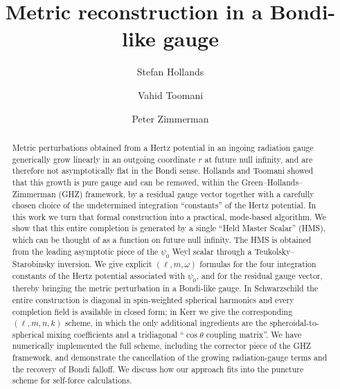 \documentclass[%
reprint,
 prd,
superscriptaddress,
nofootinbib,
aps,
dvipsnames
]{revtex4-2}
\newcommand{\emm}{m}
\def\l{\ensuremath{\ell}}                          %
\begin{document}
	
	\title{Metric reconstruction in a Bondi-like gauge}
	
	
		\author{Stefan Hollands }

\author{Vahid Toomani  \orcidlink{}}

\author{Peter Zimmerman}

	\begin{abstract}
    Metric perturbations obtained from a Hertz potential in an ingoing radiation
gauge generically grow linearly in an outgoing coordinate $r$ at future null infinity, and are
therefore not asymptotically flat in the Bondi sense.  Hollands and Toomani
showed that this growth is pure gauge and can be removed, within the
Green--Hollands--Zimmerman (GHZ) framework, by a residual gauge vector
together with a carefully chosen choice of the undetermined
integration ``constants'' of the Hertz potential. In this work we turn that formal construction into a
practical, mode-based algorithm.  
We show that this entire completion is
generated by a single ``Held Master Scalar'' (HMS), 
which can be thought of as a function on future null infinity. The HMS is 
obtained from the leading asymptotic piece of the $\psi_0$ Weyl scalar through a Teukolsky--Starobinsky inversion. We give explicit $(\l,\emm,\omega)$ formulas for the four integration constants of the Hertz potential associated with $\psi_0$, and for the residual
gauge vector, thereby bringing the metric perturbation in a Bondi-like gauge. In Schwarzschild the entire construction is diagonal in
spin-weighted spherical harmonics and every completion field is available in
closed form; in Kerr we give the corresponding $(\l,\emm,n,k)$ scheme, in
which the only additional ingredients are the spheroidal-to-spherical mixing
coefficients and a tridiagonal ``$\cos\theta$ coupling matrix''.  We have numerically implemented the full scheme, including the corrector piece of the GHZ framework, and demonstrate the cancellation of the growing radiation-gauge terms and the recovery of Bondi falloff. We discuss how our approach fits into the puncture scheme for self-force calculations.
	\end{abstract}
	
\end{document}
